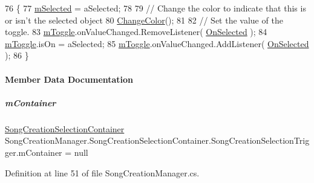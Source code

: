 \begin{DoxyCode}
76             \{
77                 \hyperlink{group___s_c_m_nest_class_a1a8086defe08acc773bdc9385a9f66d2}{mSelected} = aSelected;
78 
79                 \textcolor{comment}{// Change the color to indicate that this is or isn't the selected object}
80                 \hyperlink{group___s_c_m_nest_class_a26bd7667a86c8dc85429a5e4798dd30a}{ChangeColor}();
81 
82                 \textcolor{comment}{// Set the value of the toggle.}
83                 \hyperlink{group___s_c_m_nest_class_ad548c27e148377da02160715a0aca9ee}{mToggle}.onValueChanged.RemoveListener( \hyperlink{group___s_c_m_nest_class_a6477d6c5056af7998063e90e282b67ae}{OnSelected} );
84                 \hyperlink{group___s_c_m_nest_class_ad548c27e148377da02160715a0aca9ee}{mToggle}.isOn = aSelected;
85                 \hyperlink{group___s_c_m_nest_class_ad548c27e148377da02160715a0aca9ee}{mToggle}.onValueChanged.AddListener( \hyperlink{group___s_c_m_nest_class_a6477d6c5056af7998063e90e282b67ae}{OnSelected} );
86             \}
\end{DoxyCode}


\paragraph{Member Data Documentation}
\mbox{\label{group___s_c_m_nest_class_aae8ebcbfe18ad8706d11edac54f2da87}} 
\subparagraph{\texorpdfstring{m\+Container}{mContainer}}
{\footnotesize\ttfamily \hyperlink{group___s_c_m_nest_class_class_song_creation_manager_1_1_song_creation_selection_container}{Song\+Creation\+Selection\+Container} Song\+Creation\+Manager.\+Song\+Creation\+Selection\+Container.\+Song\+Creation\+Selection\+Trigger.\+m\+Container = null\hspace{0.3cm}{\ttfamily [private]}}



Definition at line 51 of file Song\+Creation\+Manager.\+cs.

